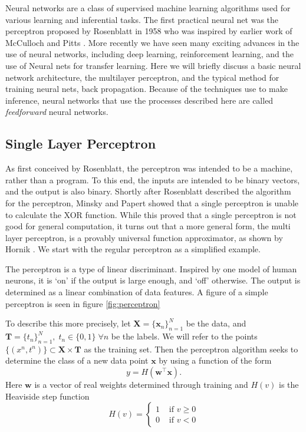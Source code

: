 Neural networks are a class of supervised machine learning algorithms used for various learning and inferential tasks.  The first practical neural net was the perceptron proposed by Rosenblatt in 1958 \cite{Rosenblatt58theperceptron} who was inspired by earlier work of McCulloch and Pitts \cite{McCulloch-Pitts}.  More recently we have seen many exciting advances in the use of neural networks, including deep learning, reinforcement learning, and the use of Neural nets for transfer learning.
Here we will briefly discuss a basic neural network architecture, the multilayer perceptron, and the typical method for training neural nets, back propagation.  Because of the techniques use to make inference, neural networks that use the processes described here are called \textit{feedforward} neural networks.
\subsection{Single Layer Perceptron}
As first conceived by Rosenblatt, the perceptron was intended to be a machine, rather than a program. To this end, the inputs are intended to be binary vectors, and the output is also binary.  Shortly after Rosenblatt described the algorithm for the perceptron, Minsky and Papert \cite{Minsky90Perceptron} showed that a single perceptron is unable to calculate the XOR function.  While this proved that a single perceptron is not good for general computation, it turns out that a more general form, the multi layer perceptron, is a provably universal function approximator, as shown by Hornik \cite{HORNIK1991251}.  We start with the regular perceptron as a simplified example.

The perceptron is a type of linear discriminant.  Inspired by one model of human neurons, it is `on' if the output is large enough, and `off' otherwise.  The output is determined as a linear combination of data features.  A figure of a simple perceptron is seen in figure \ref{fig:perceptron}



To describe this more precisely, let $\bm{X}=\{\bm x_n\}_{n=1}^{N}$ be the data, and \( \bm{T} =\{t_n\}_{n=1}^{N},\; t_n\in \{0,1\} \;\forall n \) be the labels. We will refer to the points \( \{(x^n,t^n)\}\subset\bm{X}\times \bm{T} \) as the training set. Then the perceptron algorithm seeks to determine the class of a new data point \( \bm x \) by using a function of the form
\begin{equation}\label{perceptron}
y = H(\bm w^{\intercal} \bm x).
\end{equation}
Here \( \bm w \) is a vector of real weights determined through training and  \( H(v) \) is the Heaviside step function
\[ H(v) =\begin{cases}
 			1 &\text{ if }v\geq 0\\
 			0 &\text{ if }v<0
		 \end{cases} 
\]

